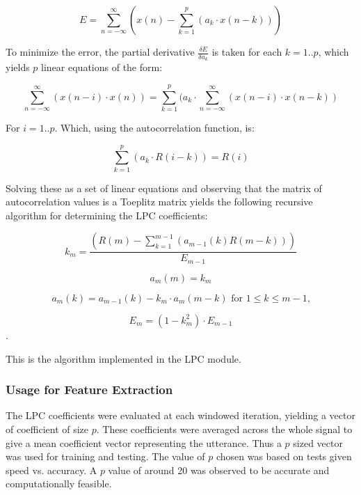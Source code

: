 $$ E = \displaystyle\sum_{n=-\infty}^{\infty}\left(x(n) - \displaystyle\sum_{k=1}^{p}(a_{k} \cdot x(n-k))\right) $$

To minimize the error, the partial derivative $\frac{{\delta}E}{{\delta}a_{k}}$ is
taken for each $k=1..p$, which yields $p$ linear equations of the form:

$$ \displaystyle\sum_{n=-\infty}^{\infty}(x(n-i) \cdot x(n)) = \displaystyle\sum_{k=1}^{p}(a_{k} \cdot \displaystyle\sum_{n=-\infty}^{\infty}(x(n-i) \cdot x(n-k)) $$

For $i=1..p$. Which, using the autocorrelation function, is:

$$ \displaystyle\sum_{k=1}^{p}(a_{k} \cdot R(i-k)) = R(i) $$

Solving these as a set of linear equations and observing that the
matrix of autocorrelation values is a Toeplitz matrix yields the
following recursive algorithm for determining the LPC coefficients:

$$ k_{m} = \frac{\left(R(m) - \displaystyle\sum_{k=1}^{m-1}\left(a_{m-1}(k)R(m-k)\right)\right)}{E_{m-1}} $$

$$ a_{m}(m) = k_{m} $$

$$ a_{m}(k) = a_{m-1}(k) - k_{m} \cdot a_{m}(m-k) \mbox{ for } 1 \le k \le m-1\mbox{,} $$

$$ E_{m} = (1 - k_{m}^2) \cdot E_{m-1} $$.

This is the algorithm implemented in the {\marf} LPC module.

\subsubsection{Usage for Feature Extraction}

The LPC coefficients were evaluated at each windowed iteration,
yielding a vector of coefficient of size $p$. These coefficients were
averaged across the whole signal to give a mean coefficient vector
representing the utterance. Thus a $p$ sized vector was used for
training and testing. The value of $p$ chosen was based on tests given
speed vs. accuracy. A $p$ value of around 20 was observed to be accurate and
computationally feasible.
